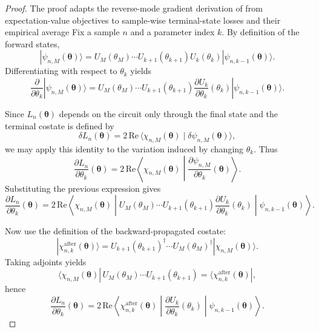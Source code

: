\documentclass[aps,prb,10pt,twocolumn,superscriptaddress]{revtex4-2}
\begin{document}
\begin{proof}
The proof adapts the reverse-mode gradient derivation of \cite{jones2020efficientcalculationgradientsclassical} from expectation-value objectives to sample-wise terminal-state losses and their empirical average
Fix a sample $n$ and a parameter index $k$.
By definition of the forward states,
\[
|\psi_{n,M}(\bm{\theta})\rangle
=
U_M(\theta_M)\cdots U_{k+1}(\theta_{k+1})
U_k(\theta_k)
|\psi_{n,k-1}(\bm{\theta})\rangle.
\]
Differentiating with respect to \(\theta_k\) yields
\[
\frac{\partial}{\partial \theta_k}|\psi_{n,M}(\bm{\theta})\rangle
=
U_M(\theta_M)\cdots U_{k+1}(\theta_{k+1})
\frac{\partial U_k}{\partial \theta_k}(\theta_k)
|\psi_{n,k-1}(\bm{\theta})\rangle.
\]

Since \(L_n(\bm{\theta})\) depends on the circuit only through the final state and the terminal
costate is defined by
\[
\delta L_n(\bm{\theta})
=
2\,\mathrm{Re}\,\langle \chi_{n,M}(\bm{\theta})\mid \delta\psi_{n,M}(\bm{\theta})\rangle,
\]
we may apply this identity to the variation induced by changing \(\theta_k\). Thus
\[
\frac{\partial L_n}{\partial \theta_k}(\bm{\theta})
=
2\,\mathrm{Re}\!\left\langle
\chi_{n,M}(\bm{\theta})
\middle|
\frac{\partial \psi_{n,M}}{\partial \theta_k}(\bm{\theta})
\right\rangle.
\]
Substituting the previous expression gives
\[
\frac{\partial L_n}{\partial \theta_k}(\bm{\theta})
=
2\,\mathrm{Re}\!\left\langle
\chi_{n,M}(\bm{\theta})
\middle|
U_M(\theta_M)\cdots U_{k+1}(\theta_{k+1})
\frac{\partial U_k}{\partial \theta_k}(\theta_k)
\middle|
\psi_{n,k-1}(\bm{\theta})
\right\rangle.
\]

Now use the definition of the backward-propagated costate:
\[
|\chi_{n,k}^{\mathrm{after}}(\bm{\theta})\rangle
=
U_{k+1}(\theta_{k+1})^\dagger\cdots U_M(\theta_M)^\dagger
|\chi_{n,M}(\bm{\theta})\rangle.
\]
Taking adjoints yields
\[
\langle \chi_{n,M}(\bm{\theta})|
\,U_M(\theta_M)\cdots U_{k+1}(\theta_{k+1})
=
\langle \chi_{n,k}^{\mathrm{after}}(\bm{\theta})|,
\]
hence
\[
\frac{\partial L_n}{\partial \theta_k}(\bm{\theta})
=
2\,\mathrm{Re}\!\left\langle
\chi_{n,k}^{\mathrm{after}}(\bm{\theta})
\middle|
\frac{\partial U_k}{\partial \theta_k}(\theta_k)
\middle|
\psi_{n,k-1}(\bm{\theta})
\right\rangle.
\]


\end{proof}
\end{document}
